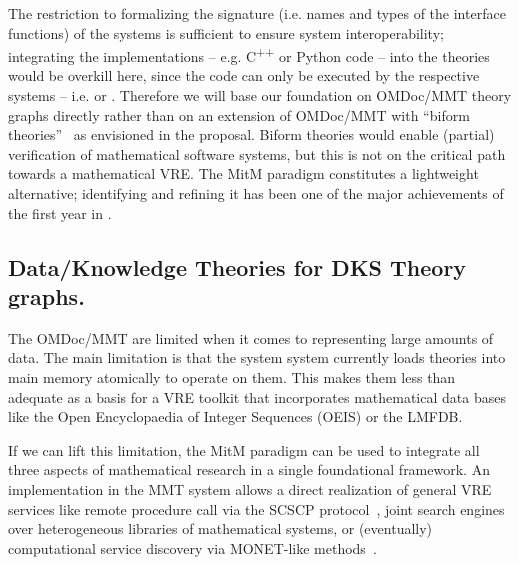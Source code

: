 The restriction to formalizing the signature (i.e. names and types of the interface
functions) of the systems is sufficient to ensure system interoperability; integrating the
implementations -- e.g. C\textsuperscript{++} or Python code -- into the theories would
be overkill here, since the code can only be executed by the respective systems --
i.e. \GAP or \SageMath. Therefore we will base our foundation on OMDoc/MMT theory graphs
directly rather than on an extension of OMDoc/MMT with ``biform
theories''~\cite{KohManRab:aumftg13,Farmer:btc07} as envisioned in the proposal. Biform
theories would enable (partial) verification of mathematical software systems, but this is
not on the critical path towards a mathematical VRE. The MitM paradigm constitutes a
lightweight alternative; identifying and refining it has been one of the major
achievements of the first year in .


\subsection{Data/Knowledge Theories for DKS Theory graphs.}\label{sec:introfinal}

The OMDoc/MMT are limited when it comes to representing large amounts of data. The main
limitation is that the system \MMT system currently loads theories into main memory
atomically to operate on them. This makes them less than adequate as a basis for a VRE
toolkit that incorporates mathematical data bases like the Open Encyclopaedia of Integer
Sequences (OEIS) or the LMFDB. 

If we can lift this limitation, the MitM paradigm can be used to integrate all three
aspects of mathematical research in a single foundational framework. An implementation in
the MMT system allows a direct realization of general VRE services like remote procedure
call via the SCSCP protocol~\cite{SCSCP,FHKLR:SCSCP08,HorRoz:ossp09}, joint search engines
over heterogeneous libraries of mathematical systems, or (eventually) computational
service discovery via MONET-like methods~\cite{aird-et-al:2005}.


